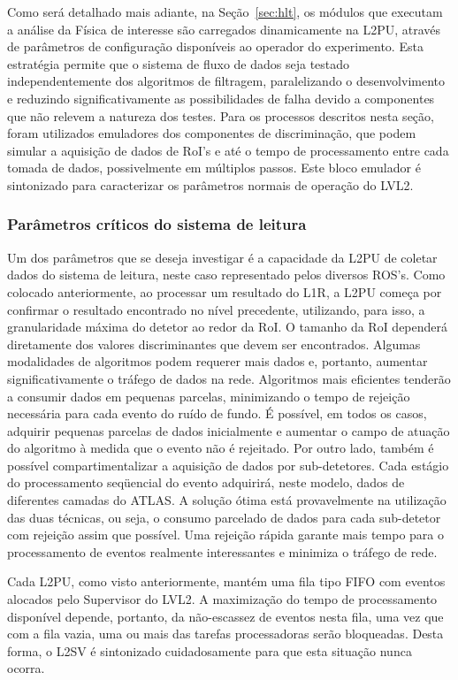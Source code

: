 Como será detalhado mais adiante, na Seção~\ref{sec:hlt}, os módulos que
executam a análise da Física de interesse são carregados dinamicamente na
L2PU, através de parâmetros de configuração disponíveis ao operador do
experimento. Esta estratégia permite que o sistema de fluxo de dados seja
testado independentemente dos algoritmos de filtragem, paralelizando o
desenvolvimento \cite{aa:tns-2004-2} e reduzindo significativamente as
possibilidades de falha devido a componentes que não relevem a natureza dos
testes. Para os processos descritos nesta seção, foram utilizados emuladores
dos componentes de discriminação, que podem simular a aquisição de dados de
RoI's e até o tempo de processamento entre cada tomada de dados, possivelmente
em múltiplos passos. Este bloco emulador é sintonizado para caracterizar os
parâmetros normais de operação do LVL2.

\subsubsection{Parâmetros críticos do sistema de leitura}

Um dos parâmetros que se deseja investigar é a capacidade da L2PU de coletar
dados do sistema de leitura, neste caso representado pelos diversos
ROS's. Como colocado anteriormente, ao processar um resultado do L1R, a L2PU
começa por confirmar o resultado encontrado no nível precedente, utilizando,
para isso, a granularidade máxima do detetor ao redor da RoI. O tamanho da RoI
dependerá diretamente dos valores discriminantes que devem ser
encontrados. Algumas modalidades de algoritmos podem requerer mais dados e,
portanto, aumentar significativamente o tráfego de dados na rede. Algoritmos
mais eficientes tenderão a consumir dados em pequenas parcelas, minimizando o
tempo de rejeição necessária para cada evento do ruído de fundo. É possível,
em todos os casos, adquirir pequenas parcelas de dados inicialmente e aumentar
o campo de atuação do algoritmo à medida que o evento não é rejeitado. Por
outro lado, também é possível compartimentalizar a aquisição de dados por
sub-detetores. Cada estágio do processamento seqüencial do evento adquirirá,
neste modelo, dados de diferentes camadas do ATLAS. A solução ótima está
provavelmente na utilização das duas técnicas, ou seja, o consumo parcelado de
dados para cada sub-detetor com rejeição assim que possível. Uma rejeição
rápida garante mais tempo para o processamento de eventos realmente
interessantes e minimiza o tráfego de rede.

Cada L2PU, como visto anteriormente, mantém uma fila tipo FIFO com eventos
alocados pelo Supervisor do LVL2. A maximização do tempo de processamento
disponível depende, portanto, da não-escassez de eventos nesta fila, uma vez
que com a fila vazia, uma ou mais das tarefas processadoras serão
bloqueadas. Desta forma, o L2SV é sintonizado cuidadosamente para que esta
situação nunca ocorra.

